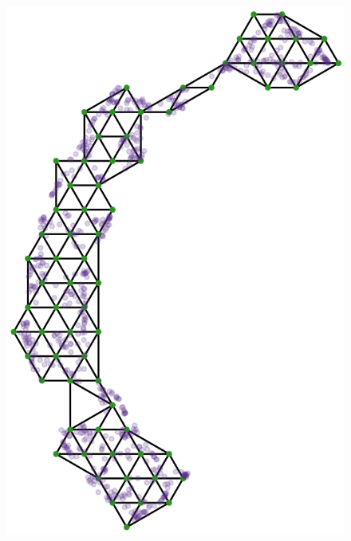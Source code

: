 \documentclass[
  12pt]{article}
\begin{document}
\begin{figure}[H]

\begin{minipage}{0.25\linewidth}
\includegraphics{figures/scurve/umap_trimesh_layout.png}\end{minipage}%
%
\begin{minipage}{0.25\linewidth}

\end{minipage}
\end{figure}
\end{document}
